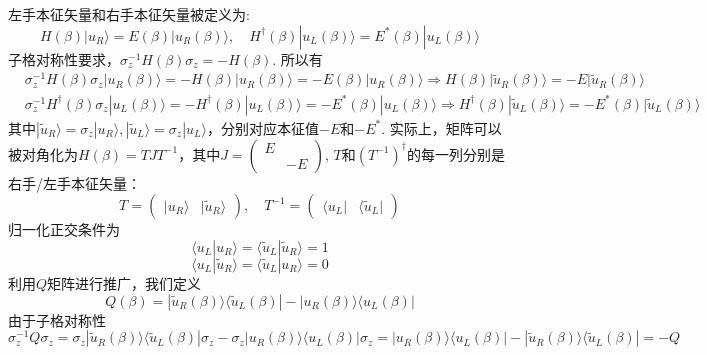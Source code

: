 \documentclass{article}
\begin{document}
左手本征矢量和右手本征矢量被定义为:
\begin{equation}
    H(\beta)|u_R\rangle=E(\beta)|u_R(\beta)\rangle,\quad H^\dagger(\beta)|u_L(\beta)\rangle=E^*(\beta)|u_L(\beta)\rangle
\end{equation}
子格对称性要求，$\sigma_z^{-1}H(\beta)\sigma_z=-H(\beta)$. 所以有
\begin{equation}
    \begin{split}
        &\sigma_z^{-1}H(\beta)\sigma_z|u_R(\beta)\rangle=-H(\beta)|u_R(\beta)\rangle=-E(\beta)|u_R(\beta)\rangle\Rightarrow H(\beta)|\tilde{u}_R(\beta)\rangle=-E|\tilde{u}_R(\beta)\rangle\\
        &\sigma_z^{-1}H^\dagger(\beta)\sigma_z|u_L(\beta)\rangle=-H^\dagger(\beta)|u_L(\beta)\rangle=-E^*(\beta)|u_L(\beta)\rangle\Rightarrow H^\dagger(\beta)|\tilde{u}_L(\beta)\rangle=-E^*(\beta)|\tilde{u}_L(\beta)\rangle
    \end{split}
\end{equation}
其中$|\tilde{u}_R\rangle=\sigma_z|u_R\rangle,|\tilde{u}_L\rangle=\sigma_z|u_L\rangle$，分别对应本征值$-E$和$-E^*$. 实际上，矩阵可以被对角化为$H(\beta)=TJT^{-1}$，其中$J=\begin{pmatrix}
    E\\
    &-E
\end{pmatrix}$, $T$和$(T^{-1})^\dagger$的每一列分别是右手/左手本征矢量：
\begin{equation}
    T=\begin{pmatrix}
        |u_R\rangle&|\tilde{u}_R\rangle
    \end{pmatrix},\quad T^{-1}=\begin{pmatrix}
        \langle u_L|&\langle\tilde{u}_L|
    \end{pmatrix}
\end{equation}
归一化正交条件为
\begin{equation}
    \langle u_L|u_R\rangle=\langle\tilde{u}_L|\tilde{u}_R\rangle=1
\end{equation}
\begin{equation}
    \langle u_L|\tilde{u}_R\rangle=\langle\tilde{u}_L|u_R\rangle=0
\end{equation}
利用$Q$矩阵进行推广，我们定义
\begin{equation}
    Q(\beta)=|\tilde{u}_R(\beta)\rangle\langle\tilde{u}_L(\beta)|-|u_R(\beta)\rangle\langle u_L(\beta)|
\end{equation}
由于子格对称性
\begin{equation}
    \sigma_z^{-1}Q\sigma_z=\sigma_z|\tilde{u}_R(\beta)\rangle\langle\tilde{u}_L(\beta)|\sigma_z-\sigma_z|u_R(\beta)\rangle\langle u_L(\beta)|\sigma_z=|u_R(\beta)\rangle\langle u_L(\beta)|-|\tilde{u}_R(\beta)\rangle\langle \tilde{u}_L(\beta)|=-Q
\end{equation}
\end{document}
